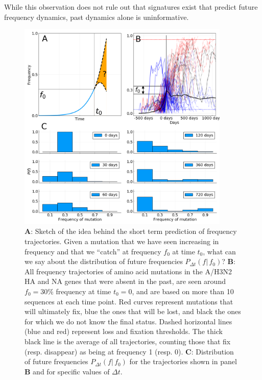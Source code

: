 \documentclass[reprint,amsmath,amssymb,superscriptaddress,showpacs,pre]{revtex4-1}
\begin{document}
While this observation does not rule out that signatures exist that predict future frequency dynamics, past dynamics alone is uninformative.

\begin{figure}
	\centering
	\includegraphics[width=0.9\textwidth]{./Figures/Panel1.png}
	\caption{\textbf{A}: Sketch of the idea behind the short term prediction of frequency trajectories. Given a mutation that we have seen increasing in frequency and that we ``catch'' at frequency $f_0$ at time $t_0$, what can we say about the distribution of future frequencies $P_{\Delta t}(f\vert\,f_0)$? \textbf{B}: All frequency trajectories of amino acid mutations in the A/H3N2 HA and NA genes that were absent in the past, are seen around $f_0=30\%$ frequency at time $t_0=0$, and are based on more than 10 sequences at each time point. Red curves represent mutations that will ultimately fix, blue the ones that will be lost, and black the ones for which we do not know the final status. Dashed horizontal lines (blue and red) represent loss and fixation thresholds. The thick black line is the average of all trajectories, counting those that fix (resp. disappear) as being at frequency 1 (resp. 0). \textbf{C}: Distribution of future frequencies $P_{\Delta t}(f\vert\,f_0)$ for the trajectories shown in panel \textbf{B} and for specific values of $\Delta t$. }
	\label{fig:trajectories}
\end{figure}
\end{document}
